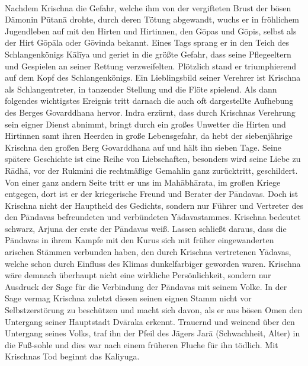 \documentclass{article}
\begin{document}
\paragraph{}
Nachdem Krischna die Gefahr, welche ihm von der vergifteten Brust der bösen Dämonin P\={u}tan\={a} drohte, durch deren Tötung abgewandt, wuchs er in fröhlichem Jugendleben auf mit den Hirten und Hirtinnen, den G\={o}pas und G\={o}pis, selbst als der Hirt G\={o}p\={a}la oder G\={o}vinda bekannt. Eines Tags sprang er in den Teich des Schlangenkönigs K\={a}l\={i}ya und geriet in die größte Gefahr, dass seine Pflegeeltern und Gespielen an seiner Rettung verzweifelten. Plötzlich stand er triumphierend auf dem Kopf des Schlangenkönigs. Ein Lieblingsbild seiner Verehrer ist Krischna als Schlangentreter, in tanzender Stellung und die Flöte spielend. Als dann folgendes wichtigstes Ereignis tritt darnach die auch oft dargestellte Aufhebung des Berges Govarddhana hervor. Indra erzürnt, dass durch Krischnas Verehrung sein eigner Dienst abnimmt, bringt durch ein großes Unwetter die Hirten und Hirtinnen samt ihren Heerden in große Lebensgefahr, da hebt der siebenjährige Krischna den großen Berg Govarddhana auf und hält ihn sieben Tage. Seine spätere Geschichte ist eine Reihe von Liebschaften, besonders wird seine Liebe zu R\={a}dh\={a}, vor der Rukmini die rechtmäßige Gemahlin ganz zurücktritt, geschildert. Von einer ganz andern Seite tritt er uns im Mah\={a}bh\={a}rata, im großen Kriege entgegen, dort ist er der kriegerische Freund und Berater der P\={a}ndavas. Doch ist Krischna nicht der Hauptheld des Gedichts, sondern nur Führer und Vertreter des den P\={a}ndavas befreundeten und verbündeten Y\={a}davastammes. Krischna bedeutet schwarz, Arjuna der erste der P\={a}ndavas weiß. Lassen schließt daraus, dass die P\={a}ndavas in ihrem Kampfe mit den Kurus sich mit früher eingewanderten arischen Stämmen verbunden haben, den durch Krischna vertretenen Y\={a}davas, welche schon durch Einfluss des Klimas dunkelfarbiger geworden waren. Krischna wäre demnach überhaupt nicht eine wirkliche Persönlichkeit, sondern nur Ausdruck der Sage für die Verbindung der P\={a}ndavas mit seinem Volke. In der Sage vermag Krischna zuletzt diesen seinen eignen Stamm nicht vor Selbstzerstörung zu beschützen und macht sich davon, als er aus bösen Omen den Untergang seiner Hauptstadt Dv\={a}raka erkennt. Trauernd und weinend über den Untergang seines Volks, traf ihn der Pfeil des Jägers Jar\={a} (Schwachheit, Alter) in die Fuß-sohle und dies war nach einem früheren Fluche für ihn tödlich. Mit Krischnas Tod beginnt das Kaliyuga.
\end{document}
